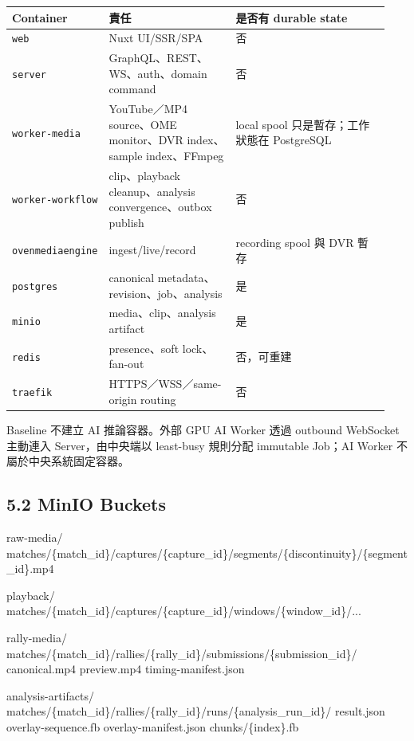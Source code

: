 \documentclass[
  9pt,
  a4paper,
]{article}
\newenvironment{Shaded}{}{}
\newcommand{\NormalTok}[1]{#1}
\begin{document}
\begin{longtable}[]{@{}>{\RaggedRight\arraybackslash}p{0.18\linewidth}>{\RaggedRight\arraybackslash}p{0.34\linewidth}>{\RaggedRight\arraybackslash}p{0.42\linewidth}@{}}
\toprule\noalign{}
Container & 責任 & 是否有 durable state \\
\midrule\noalign{}
\endhead
\bottomrule\noalign{}
\endlastfoot
\texttt{web} & Nuxt UI/SSR/SPA & 否 \\
\texttt{server} & GraphQL、REST、WS、auth、domain command & 否 \\
\texttt{worker-media} & YouTube／MP4 source、OME monitor、DVR index、sample
index、FFmpeg & local spool 只是暫存；工作狀態在 PostgreSQL \\
\texttt{worker-workflow} & clip、playback cleanup、analysis convergence、outbox
publish & 否 \\
\texttt{ovenmediaengine} & ingest/live/record & recording spool 與 DVR 暫存 \\
\texttt{postgres} & canonical metadata、revision、job、analysis & 是 \\
\texttt{minio} & media、clip、analysis artifact & 是 \\
\texttt{redis} & presence、soft lock、fan-out & 否，可重建 \\
\texttt{traefik} & HTTPS／WSS／same-origin routing & 否 \\
\end{longtable}

Baseline 不建立 AI 推論容器。外部 GPU AI Worker 透過 outbound WebSocket 主動連入
Server，由中央端以 least-busy 規則分配 immutable Job；AI Worker 不屬於中央系統固定容器。

\subsection{5.2 MinIO Buckets}\label{52-minio-buckets}

\begin{Shaded}
\begin{Highlighting}[]
\NormalTok{raw{-}media/}
\NormalTok{  matches/\{match\_\allowbreak{}id\}/captures/\{capture\_\allowbreak{}id\}/segments/\{discontinuity\}/\{segment\_\allowbreak{}id\}.mp4}

\NormalTok{playback/}
\NormalTok{  matches/\{match\_\allowbreak{}id\}/captures/\{capture\_\allowbreak{}id\}/windows/\{window\_\allowbreak{}id\}/...}

\NormalTok{rally{-}media/}
\NormalTok{  matches/\{match\_\allowbreak{}id\}/rallies/\{rally\_\allowbreak{}id\}/submissions/\{submission\_\allowbreak{}id\}/}
\NormalTok{    canonical.mp4}
\NormalTok{    preview.mp4}
\NormalTok{    timing{-}manifest.json}

\NormalTok{analysis{-}artifacts/}
\NormalTok{  matches/\{match\_\allowbreak{}id\}/rallies/\{rally\_\allowbreak{}id\}/runs/\{analysis\_\allowbreak{}run\_\allowbreak{}id\}/}
\NormalTok{    result.json}
\NormalTok{    overlay{-}sequence.fb}
\NormalTok{    overlay{-}manifest.json}
\NormalTok{    chunks/\{index\}.fb}
\end{Highlighting}
\end{Shaded}
\end{document}
